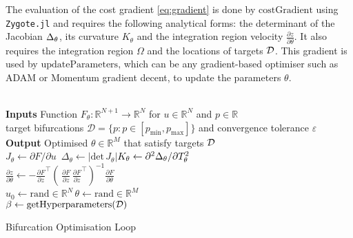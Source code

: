 The evaluation of the cost gradient \eqref{eq:gradient} is done by $\mathrm{costGradient}$ using \texttt{Zygote.jl} \cite{Innes2018DontPrograms} and requires the following analytical forms: the determinant of the Jacobian $\Delta_{\theta}$, its curvature $K_{\theta}$ and the integration region velocity $\frac{\partial z}{\partial\theta}$. It also requires the integration region $\Omega$ and the locations of targets $\mathcal{D}$. This gradient is used by $\mathrm{updateParameters}$, which can be any gradient-based optimiser such as ADAM or Momentum gradient decent, to update the parameters $\theta$.
\\\\
\begin{algorithm*}[H]
\label{alg:optimisation-loop}
\SetAlgoLined
\textbf{Inputs} Function $F_{\theta}:\mathbb{R}^{N+1}\rightarrow\mathbb{R}^{N}$ for $u\in\mathbb{R}^N$ and $p\in\mathbb{R}$\\ target bifurcations $\mathcal{D}=\{p:p\in[p_{\min},p_{\max}]\}$ and convergence tolerance $\varepsilon$\\
\textbf{Output} Optimised $\theta\in\mathbb{R}^M$ that satisfy targets $\mathcal{D}$\\
$J_{\theta}\leftarrow\partial F/\partial u$\qquad\,
$\Delta_{\theta}\leftarrow|\mathrm{det}\,J_{\theta}|$\qquad$K_{\theta}\leftarrow\partial^2\Delta_{\theta}/\partial T_{\theta}^2$\\
$\frac{\partial z}{\partial\theta}\leftarrow- \frac{\partial F}{\partial z}^\top
    \left(\,
        \frac{\partial F}{\partial z}\,\frac{\partial F}{\partial z}^\top
    \right)^{-1}
    \frac{\partial F}{\partial\theta}$\\
$u_0\leftarrow\mathrm{rand}\in\mathbb{R}^{N}$\quad\,$\theta\leftarrow\mathrm{rand}\in\mathbb{R}^{M}$\\
$\beta\leftarrow\mathrm{getHyperparameters}(\mathcal{D})$\\
\caption{Bifurcation Optimisation Loop}
\end{algorithm*}

